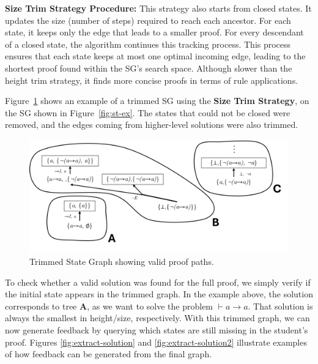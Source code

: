 \documentclass[runningheads]{llncs}
\begin{document}
\vspace{0.5em}
\textbf{Size Trim Strategy Procedure:}  
This strategy also starts from closed states. It updates the size (number of steps) required to reach each ancestor. For each state, it keeps only the edge that leads to a smaller proof. For every descendant
of a closed state, the algorithm continues this tracking process. This process ensures that each state keeps at most one optimal incoming edge, leading to the shortest proof found within the SG's search space. Although slower than the height trim strategy, it finds more concise proofs in terms of rule applications.

\vspace{1em}
Figure~\ref{fig:sg-trim} shows an example of a trimmed SG using the \textbf{Size Trim Strategy}, on the SG shown in Figure~\ref{fig:st-ex}. The states that could not be closed were removed, and the edges coming from higher-level solutions were also trimmed.

\begin{figure}
    \centering
    \includegraphics[width=1\linewidth]{resources/sg-final.jpg}
    \caption{Trimmed State Graph showing valid proof paths.}
    \label{fig:sg-trim}
\end{figure}

To check whether a valid solution was found for the full proof, we simply verify if the initial state appears in the trimmed graph. In the example above, the solution corresponds to tree \textbf{A}, as we want to solve the problem \(\vdash a \to a\). That solution is always the smallest in height/size, respectively. With this trimmed graph, we can now generate feedback by querying which states are still missing in the student’s proof. Figures \ref{fig:extract-solution} and \ref{fig:extract-solution2} illustrate examples of how feedback can be generated from the final graph.
\end{document}

